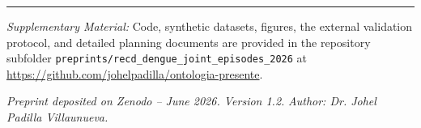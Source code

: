\documentclass[11pt,a4paper]{article}
\begin{document}
\vspace{0.8em}
\hrule
\vspace{0.5em}
\noindent\textit{Supplementary Material:} Code, synthetic datasets, figures, the external validation protocol, and detailed planning documents are provided in the repository subfolder \texttt{preprints/recd\_dengue\_joint\_episodes\_2026} at \url{https://github.com/johelpadilla/ontologia-presente}.

\vspace{0.6em}
\noindent\textit{Preprint deposited on Zenodo – June 2026. Version 1.2.}  
\noindent\textit{Author: Dr. Johel Padilla Villaunueva.}
\end{document}
